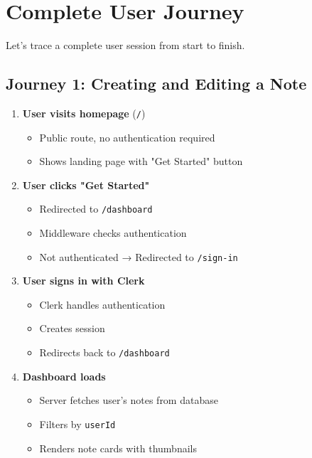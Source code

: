\documentclass[11pt,a4paper]{article}
\begin{document}
\section{Complete User Journey}

Let's trace a complete user session from start to finish.

\subsection{Journey 1: Creating and Editing a Note}

\begin{enumerate}
    \item \textbf{User visits homepage} (\texttt{/})
    \begin{itemize}
        \item Public route, no authentication required
        \item Shows landing page with "Get Started" button
    \end{itemize}
    
    \item \textbf{User clicks "Get Started"}
    \begin{itemize}
        \item Redirected to \texttt{/dashboard}
        \item Middleware checks authentication
        \item Not authenticated → Redirected to \texttt{/sign-in}
    \end{itemize}
    
    \item \textbf{User signs in with Clerk}
    \begin{itemize}
        \item Clerk handles authentication
        \item Creates session
        \item Redirects back to \texttt{/dashboard}
    \end{itemize}
    
    \item \textbf{Dashboard loads}
    \begin{itemize}
        \item Server fetches user's notes from database
        \item Filters by \texttt{userId}
        \item Renders note cards with thumbnails
    \end{itemize}
    

\end{enumerate}
\end{document}
